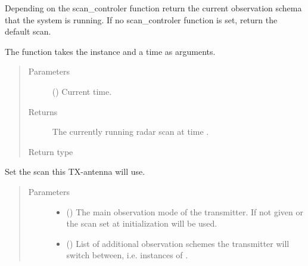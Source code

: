 \documentclass[letterpaper,10pt,english]{sphinxmanual}
\begin{document}
\begin{fulllineitems}
\begin{fulllineitems}
Depending on the scan\_controler function return the current observation schema that the system is running. If no scan\_controler function is set, return the default scan.

The  function takes the {\hyperref[\detokenize{modules/antenna:antenna.AntennaTX}]{}} instance and a time as arguments.
\begin{quote}\begin{description}
\item[{Parameters}] \leavevmode
{} () \textendash{} Current time.

\item[{Returns}] \leavevmode
The currently running radar scan at time .

\item[{Return type}] \leavevmode
{\hyperref[\detokenize{modules/radar_scans:radar_scans.RadarScan}]{}}

\end{description}\end{quote}

\end{fulllineitems}


\begin{fulllineitems}
\label{\detokenize{modules/antenna:antenna.AntennaTX.set_scan}}
Set the scan this TX-antenna will use.
\begin{quote}\begin{description}
\item[{Parameters}] \leavevmode\begin{itemize}
\item {} 
 ({\hyperref[\detokenize{modules/radar_scans:radar_scans.RadarScan}]{}}) \textendash{} The main observation mode of the transmitter. If not given or  the scan set at initialization will be used.

\item {} 
 () \textendash{} List of additional observation schemes the transmitter will switch between, i.e. instances of .


\end{itemize}
\end{description}
\end{quote}
\end{fulllineitems}
\end{fulllineitems}
\end{document}
